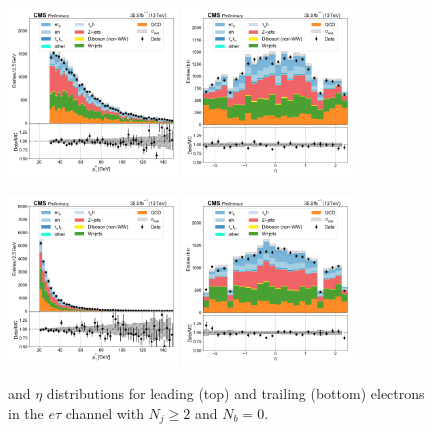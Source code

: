 \begin{figure}[htb!]
    \centering
    \includegraphics[width=0.4\textwidth]{chapters/Analysis/sectionPlots/figures/data_mc_overlays/etau_2016_cat_gt2_eq0_signal_linear_lepton_lepton1_pt}
    \includegraphics[width=0.4\textwidth]{chapters/Analysis/sectionPlots/figures/data_mc_overlays/etau_2016_cat_gt2_eq0_signal_linear_lepton_lepton1_eta}

    \includegraphics[width=0.4\textwidth]{chapters/Analysis/sectionPlots/figures/data_mc_overlays/etau_2016_cat_gt2_eq0_signal_linear_lepton_lepton2_pt}
    \includegraphics[width=0.4\textwidth]{chapters/Analysis/sectionPlots/figures/data_mc_overlays/etau_2016_cat_gt2_eq0_signal_linear_lepton_lepton2_eta}
    \caption{\pt and $\eta$ distributions for leading (top) and trailing
        (bottom) electrons in the $e\tau$ channel with $N_{j} \geq 2$ and
        $N_{b} = 0$.}
    \label{fig:analysis:plots:etau_4_kinematic}
\end{figure}

